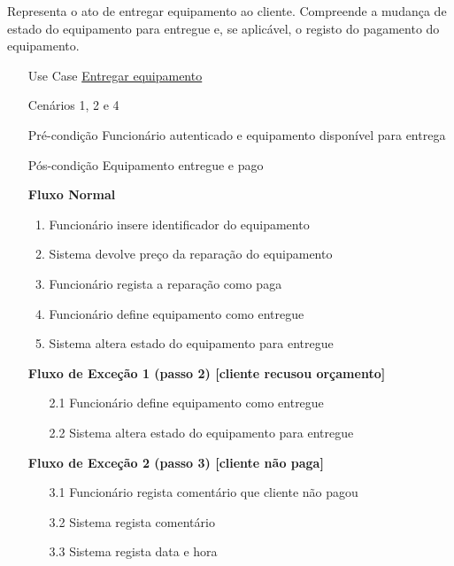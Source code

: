 \documentclass[../relatorio.tex]{subfiles}
\begin{document}
Representa o ato de entregar equipamento ao cliente.
Compreende a mudança de estado do equipamento para entregue
e, se aplicável, o registo do pagamento do equipamento.
\begin{itemize}
    \item[Use Case] {\underline{Entregar equipamento}}
    \item[Cenários] {1, 2 e 4}
    \item[Pré-condição] {Funcionário autenticado e equipamento disponível para entrega}
    \item[Pós-condição] {Equipamento entregue e pago}
          \begin{flushleft}
              \textbf{Fluxo Normal}
          \end{flushleft}
          \begin{enumerate}
              \item Funcionário insere identificador do equipamento
              \item Sistema devolve preço da reparação do equipamento
              \item Funcionário regista a reparação como paga
              \item Funcionário define equipamento como entregue
              \item Sistema altera estado do equipamento para entregue
          \end{enumerate}
          \begin{flushleft}
              \textbf{Fluxo de Exceção 1 (passo 2) [cliente recusou orçamento]}
          \end{flushleft}
          \begin{itemize}
              \item[2.1] Funcionário define equipamento como entregue
              \item[2.2] Sistema altera estado do equipamento para entregue
          \end{itemize}
             \begin{flushleft}
                 \textbf{Fluxo de Exceção 2 (passo 3) [cliente não paga]}
             \end{flushleft}
             \begin{itemize}
                 \item[3.1]{Funcionário regista comentário que cliente não pagou}
                 \item[3.2]{Sistema regista comentário}
                 \item[3.3]{Sistema regista data e hora}  
             \end{itemize}
\end{itemize}
\end{document}
